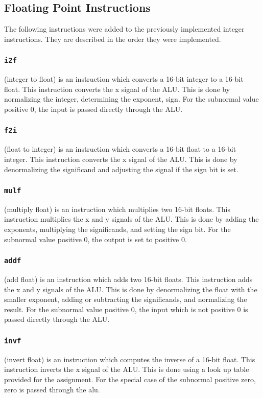 \documentclass[conference]{IEEEtran}
\begin{document}
\subsection{Floating Point Instructions}
The following instructions were added to the previously implemented integer
instructions. They are described in the order they were implemented.
\subsubsection{\texttt{i2f}}
(integer to float) is an instruction which converts a 16-bit
integer to a 16-bit float. This instruction converts the x signal of the ALU.
This is done by normalizing the integer, determining
the exponent, sign. For the subnormal value positive 0, the input is passed
directly through the ALU.
\subsubsection{\texttt{f2i}}
(float to integer) is an instruction which converts a 16-bit
float to a 16-bit integer. This instruction converts the x signal of the ALU.
This is done by denormalizing the significand and adjusting the signal if the
sign bit is set. 
\subsubsection{\texttt{mulf}}
(multiply float) is an instruction which multiplies two 16-bit
floats. This instruction multiplies the x and y signals of the ALU. This is 
done by adding the exponents, multiplying the significands, and setting the
sign bit. For the subnormal value positive 0, the output is set to positive
0.
\subsubsection{\texttt{addf}}
(add float) is an instruction which adds two 16-bit floats. This
instruction adds the x and y signals of the ALU. This is done by denormalizing
the float with the smaller exponent, adding or subtracting the significands,
and normalizing the result. For the subnormal value positive 0, the input which
is not positive 0 is passed directly through the ALU.
\subsubsection{\texttt{invf}}
(invert float) is an instruction which computes the inverse of a 16-bit
float. This instruction inverts the x signal of the ALU. This is done using
a look up table provided for the assignment.\cite{invf-lut} For the special
case of the subnormal positive zero, zero is passed through the alu.
\end{document}
